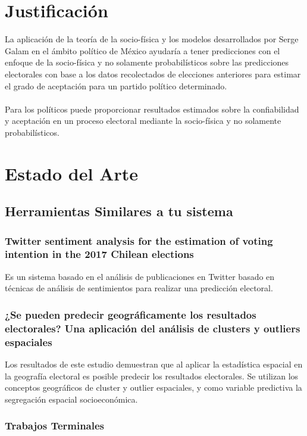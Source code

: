 \section{Justificación}
La aplicación de la teoría de la socio-física y los modelos desarrollados por Serge Galam en el ámbito político de México ayudaría a tener predicciones con el enfoque de la socio-física y no solamente probabilísticos sobre las predicciones electorales con base a los datos recolectados de elecciones anteriores para estimar el grado de aceptación para un partido político determinado.
\\
\\
Para los políticos puede proporcionar resultados estimados sobre la confiabilidad y aceptación en un proceso electoral mediante la socio-física y no solamente probabilísticos.

\section{Estado del Arte}
\subsection{Herramientas Similares a tu sistema}
\subsubsection{Twitter sentiment analysis for the estimation of voting intention in the 2017 Chilean elections}
Es un sistema basado en el análisis de publicaciones en Twitter basado en técnicas de análisis de sentimientos para realizar una predicción electoral.\cite{TomasAlegreSepulveda2020}

\subsubsection{¿Se pueden predecir geográficamente los resultados electorales? Una aplicación del análisis de clusters y outliers espaciales}
Los resultados de este estudio demuestran que al aplicar la estadística espacial en la geografía electoral es posible predecir los resultados electorales. Se utilizan los conceptos geográficos de cluster y outlier espaciales, y como variable predictiva la segregación espacial socioeconómica.\cite{Perdomo2008}

\subsubsection{Trabajos Terminales}
 
